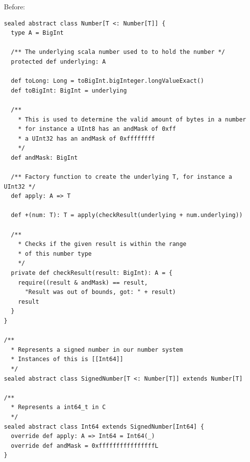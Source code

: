\documentclass[runningheads]{llncs}
\begin{document}
Before:
\begin{lstlisting}[style=scala]
sealed abstract class Number[T <: Number[T]] {
  type A = BigInt

  /** The underlying scala number used to to hold the number */
  protected def underlying: A

  def toLong: Long = toBigInt.bigInteger.longValueExact()
  def toBigInt: BigInt = underlying

  /**
    * This is used to determine the valid amount of bytes in a number
    * for instance a UInt8 has an andMask of 0xff
    * a UInt32 has an andMask of 0xffffffff
    */
  def andMask: BigInt

  /** Factory function to create the underlying T, for instance a UInt32 */
  def apply: A => T

  def +(num: T): T = apply(checkResult(underlying + num.underlying))

  /**
    * Checks if the given result is within the range
    * of this number type
    */
  private def checkResult(result: BigInt): A = {
    require((result & andMask) == result,
      "Result was out of bounds, got: " + result)
    result
  }
}

/**
  * Represents a signed number in our number system
  * Instances of this is [[Int64]]
  */
sealed abstract class SignedNumber[T <: Number[T]] extends Number[T]

/**
  * Represents a int64_t in C
  */
sealed abstract class Int64 extends SignedNumber[Int64] {
  override def apply: A => Int64 = Int64(_)
  override def andMask = 0xffffffffffffffffL
}
\end{lstlisting}
\end{document}
